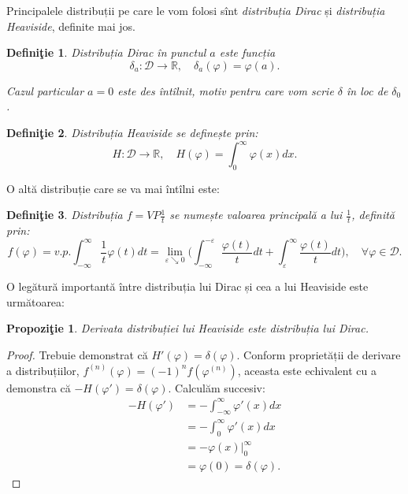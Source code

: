 \documentclass[12pt,a4paper]{article}
\newcommand\kal{\mathcal}
\newcommand\RR{\mathbb{R}}
\theoremstyle{dotless}
\newtheorem{proposition}{Propozi\c{t}ie}
\theoremstyle{dotlessdr}
\newtheorem{definition}{Defini\c{t}ie}
\begin{document}
Principalele distribuții pe care le vom folosi sînt \emph{distribuția Dirac} și
\emph{distribuția Heaviside}, definite mai jos.

\begin{definition}\label{def:distr-dirac}
  \emph{Distribuția Dirac} în punctul $ a $ este funcția
  \[
    \delta_a : \kal{D} \to \RR, \quad \delta_a(\varphi) = \varphi(a).
  \]

  Cazul particular $ a = 0 $ este des întîlnit, motiv pentru care vom scrie $ \delta $ în
  loc de $ \delta_0 $.
\end{definition}

\begin{definition}\label{def:distr-heaviside}
  \emph{Distribuția Heaviside} se definește prin:
  \[
    H : \kal{D} \to \RR, \quad H(\varphi) = \int_0^\infty \varphi(x) dx.
  \]
\end{definition}

O altă distribuție care se va mai întîlni este:

\begin{definition}\label{def:distr-vp}
  Distribuția $ f = VP \frac{1}{t} $ se numește \emph{valoarea principală} a lui $ \frac{1}{t} $,
  definită prin:
  \[
    f(\varphi) = v.p. \int_{-\infty}^\infty \frac{1}{t} \varphi(t) dt = %
    \lim_{\varepsilon \searrow 0} \Big( \int_{-\infty}^{-\varepsilon} \frac{\varphi(t)}{t} dt + %
    \int_\varepsilon^\infty \frac{\varphi(t)}{t} dt \Big), \quad \forall \varphi \in \kal{D}.
  \]
\end{definition}

O legătură importantă între distribuția lui Dirac și cea a lui Heaviside este următoarea:

\begin{proposition}\label{pr:dirac-h}
  Derivata distribuției lui Heaviside este distribuția lui Dirac.
\end{proposition}

\begin{proof}
  Trebuie demonstrat că $ H'(\varphi) = \delta(\varphi) $. Conform proprietății de derivare
  a distribuțiilor, $ f^{(n)}(\varphi) = (-1)^n f(\varphi^{(n)}) $, aceasta este echivalent
  cu a demonstra că $ -H(\varphi') = \delta(\varphi) $. Calculăm succesiv:
  \begin{align*}
    -H(\varphi') &= -\int_{-\infty}^\infty \varphi'(x) dx \\
                 &= - \int_0^\infty \varphi'(x) dx \\
                 &= -\varphi(x) \Big|_0^\infty \\
                 &= \varphi(0) = \delta(\varphi).
  \end{align*}
\end{proof}
\end{document}
